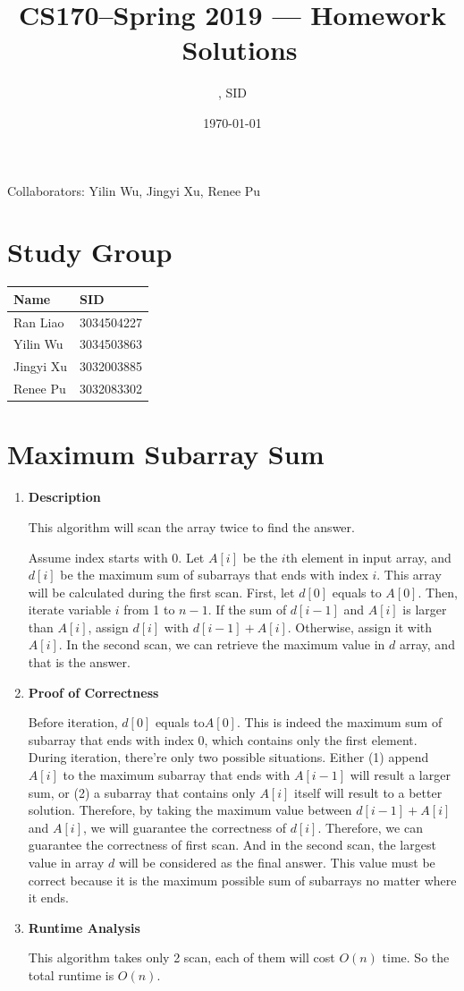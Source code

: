 \documentclass[11pt]{article}
\title{CS170--Spring 2019 --- Homework \Homework\ Solutions}
\author{\Name, SID \SID}
\date{\today}
\newenvironment{qparts}{\begin{enumerate}[{(}a{)}]}{\end{enumerate}}
\begin{document}
\maketitle
Collaborators: Yilin Wu, Jingyi Xu, Renee Pu

\section{Study Group}
	\begin{tabular}{ll}
		Name		&   SID         		\\\hline
		Ran Liao		&   3034504227  	\\  
		Yilin Wu		&   3034503863  	\\
		Jingyi Xu		&   3032003885  	\\
		Renee Pu		&   3032083302  	\\
	\end{tabular}



\newpage
\section{Maximum Subarray Sum}

\begin{qparts}
	\item \textbf{Description}

	This algorithm will scan the array twice to find the answer.
		
	Assume index starts with 0. Let $A[i]$ be the $i$th element in input array, and $d[i]$ be the maximum sum of subarrays that ends with index $i$. This array will be calculated during the first scan. First, let $d[0]$ equals to $A[0]$. Then, iterate variable $i$ from 1 to $n-1$. If the sum of $d[i-1]$ and $A[i]$ is larger than $A[i]$, assign $d[i]$ with $d[i-1] + A[i]$. Otherwise, assign it with $A[i]$. In the second scan, we can retrieve the maximum value in $d$ array, and that is the answer.
	
	\item \textbf{Proof of Correctness}
	
	Before iteration, $d[0]$ equals to$A[0]$. This is indeed the maximum sum of subarray that ends with index 0, which contains only the first element. During iteration, there're only two possible situations. Either (1) append $A[i]$ to the maximum subarray that ends with $A[i-1]$ will result a larger sum, or (2) a subarray that contains only $A[i]$ itself will result to a better solution. Therefore, by taking the maximum value between $d[i-1] + A[i]$ and $A[i]$, we will guarantee the correctness of $d[i]$. Therefore, we can guarantee the correctness of first scan. And in the second scan, the largest value in array $d$ will be considered as the final answer. This value must be correct because it is the maximum possible sum of subarrays no matter where it ends.
	
	\item \textbf{Runtime Analysis}
	
	This algorithm takes only 2 scan, each of them will cost $O(n)$ time. So the total runtime is $O(n)$.

\end{qparts}
\end{document}
